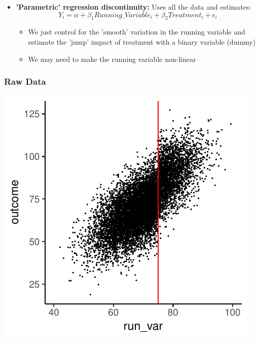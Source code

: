 \documentclass[xcolor=x11names,compress]{beamer}\usepackage[]{graphicx}\usepackage[]{color}
\makeatletter
\def\maxwidth{ %
  \ifdim\Gin@nat@width>\linewidth
    \linewidth
  \else
    \Gin@nat@width
  \fi
}
\newenvironment{knitrout}{}{} %
\renewcommand{\(}{\begin{columns}}
\renewcommand{\)}{\end{columns}}
\newcommand{\<}[1]{\begin{column}{#1}}
\renewcommand{\>}{\end{column}}
\makeatother
\begin{document}
\begin{frame}
\begin{itemize}
\item \textbf{'Parametric' regression discontinuity:} Uses all the data and estimates:
$$Y_i = \alpha + \beta_1 Running\_Variable_i + \beta_2 Treatment_i + \epsilon_i$$
\pause
\begin{itemize}
\item We just control for the 'smooth' variation in the running variable and estimate the 'jump' impact of treatment with a binary variable (dummy)
\pause
\item We may need to make the running variable non-linear
\end{itemize}
\end{itemize}
\end{frame}


\begin{frame}
\frametitle{Raw Data}
\begin{center}
\begin{knitrout}
\color{fgcolor}
\includegraphics[width=\maxwidth]{figure/chart1-1} 

\end{knitrout}
\end{center}
\end{frame}
\end{document}
